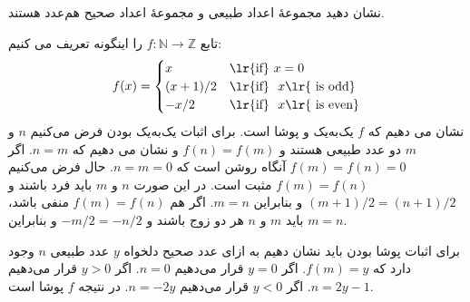 
نشان دهید مجموعهٔ اعداد طبیعی و مجموعهٔ اعداد صحیح هم‌عدد هستند.
\begin{ans}
    تابع 
    $f:\mathbb{N}\to\mathbb{Z}$
    را اینگونه تعریف می کنیم:
    \[
    f(x) = 
    \begin{cases}
        x & \text{\lr{if}} \ x = 0\\
        (x+1)/2 & \text{\lr{if}} \ \ x \text{\lr{ is odd}}\\
        -x/2 & \text{\lr{if}} \ \ x \text{\lr{ is even}}\\
    \end{cases}
    \]
    نشان می دهیم که 
    $f$
    یک‌به‌یک و پوشا است. برای اثبات یک‌به‌یک بودن فرض می‌کنیم
    $n$
    و
    $m$
    دو عدد طبیعی هستند و 
    $f(n) = f(m)$
    و نشان می دهیم که 
    $n = m$.
    اگر 
    $f(m)=f(n) = 0$
    آنگاه روشن است که
    $n = m = 0$.
    حال فرض می‌کنیم $f(m)=f(n)$ مثبت است.
    در این صورت $n$ و $m$ باید فرد باشند و
    $(m+1)/2=(n+1)/2$
    و بنابراین
    $m=n$.
    اگر هم
    $f(m)=f(n)$
    منفی باشد، باید
    $m$
    و
    $n$
    هر دو زوج باشند و
    $-m/2=-n/2$
    و بنابراین
    $m=n$.

    برای اثبات پوشا بودن باید نشان دهیم به ازای عدد صحیح دلخواه
    $y$
    عدد طبیعی
    $n$
    وجود دارد که 
    $f(m) = y$.
    اگر
    $y = 0$
    قرار می‌دهیم
    $n=0$.
    اگر
    $y>0$
    قرار می‌دهیم
    $n=2y-1$.
    اگر
    $y<0$
    قرار می‌دهیم
    $n=-2y$.
    در نتیجه
    $f$
    پوشا است.
\end{ans}
